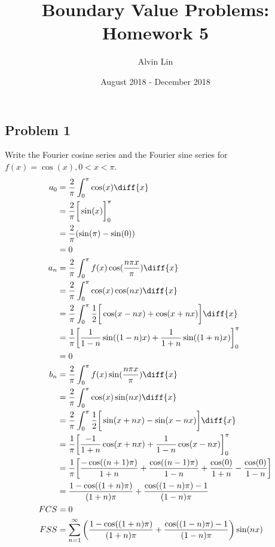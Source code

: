 \documentclass{math}
\title{Boundary Value Problems: Homework 5}
\author{Alvin Lin}
\date{August 2018 - December 2018}
\begin{document}
\maketitle

\subsection*{Problem 1}
Write the Fourier cosine series and the Fourier sine series for
\( f(x) = \cos(x), 0<x<\pi \).
\begin{align*}
  a_0 &= \frac{2}{\pi}\int_{0}^{\pi}\cos(x)\diff{x} \\
  &= \frac{2}{\pi}\bigg[\sin(x)\bigg]_{0}^{\pi} \\
  &= \frac{2}{\pi}(\sin(\pi)-\sin(0)) \\
  &= 0 \\
  a_n &= \frac{2}{\pi}\int_{0}^{\pi}f(x)\cos(\frac{n\pi x}{\pi})\diff{x} \\
  &= \frac{2}{\pi}\int_{0}^{\pi}\cos(x)\cos(nx)\diff{x} \\
  &= \frac{2}{\pi}\int_{0}^{\pi}\frac{1}{2}\bigg[
    \cos(x-nx)+\cos(x+nx)\bigg]\diff{x} \\
  &= \frac{1}{\pi}\bigg[
    \frac{1}{1-n}\sin((1-n)x)+\frac{1}{1+n}\sin((1+n)x)\bigg]_{0}^{\pi} \\
  &= 0 \\
  b_n &= \frac{2}{\pi}\int_{0}^{\pi}f(x)\sin(\frac{n\pi x}{\pi})\diff{x} \\
  &= \frac{2}{\pi}\int_{0}^{\pi}\cos(x)\sin(nx)\diff{x} \\
  &= \frac{2}{\pi}\int_{0}^{\pi}\frac{1}{2}\bigg[
    \sin(x+nx)-\sin(x-nx)\bigg]\diff{x} \\
  &= \frac{1}{\pi}\bigg[
    \frac{-1}{1+n}\cos(x+nx)+\frac{1}{1-n}\cos(x-nx)\bigg]_{0}^{\pi} \\
  &= \frac{1}{\pi}\bigg[
    \frac{-\cos((n+1)\pi)}{1+n}+
    \frac{\cos((n-1)\pi)}{1-n}+
    \frac{\cos(0)}{1+n}-
    \frac{\cos(0)}{1-n}
  \bigg] \\
  &= \frac{1-\cos((1+n)\pi)}{(1+n)\pi}+\frac{\cos((1-n)\pi)-1}{(1-n)\pi} \\
  FCS &= 0 \\
  FSS &= \sum_{n=1}^{\infty}
    \left(
      \frac{1-\cos((1+n)\pi)}{(1+n)\pi}+\frac{\cos((1-n)\pi)-1}{(1-n)\pi}
    \right)\sin(nx)
\end{align*}
\end{document}
